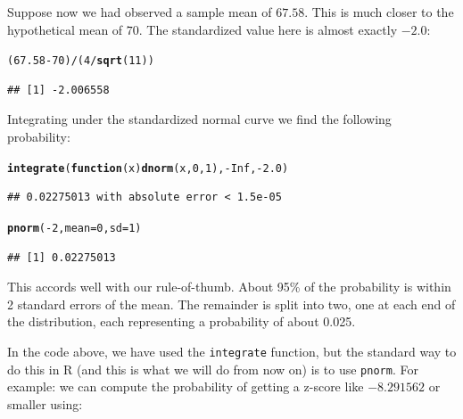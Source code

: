 \documentclass[12pt]{book}\usepackage[]{graphicx}\usepackage[]{color}
\makeatletter
\newcommand{\hlnum}[1]{\textcolor[rgb]{0.686,0.059,0.569}{#1}}%
\newcommand{\hlopt}[1]{\textcolor[rgb]{0,0,0}{#1}}%
\newcommand{\hlstd}[1]{\textcolor[rgb]{0.345,0.345,0.345}{#1}}%
\newcommand{\hlkwa}[1]{\textcolor[rgb]{0.161,0.373,0.58}{\textbf{#1}}}%
\newcommand{\hlkwc}[1]{\textcolor[rgb]{0.333,0.667,0.333}{#1}}%
\newcommand{\hlkwd}[1]{\textcolor[rgb]{0.737,0.353,0.396}{\textbf{#1}}}%
\newenvironment{kframe}{%
 \def\at@end@of@kframe{}%
 \ifinner\ifhmode%
  \def\at@end@of@kframe{\end{minipage}}%
  \begin{minipage}{\columnwidth}%
 \fi\fi%
 \def\FrameCommand##1{\hskip\@totalleftmargin \hskip-\fboxsep
 \colorbox{shadecolor}{##1}\hskip-\fboxsep
     \hskip-\linewidth \hskip-\@totalleftmargin \hskip\columnwidth}%
 \MakeFramed {\advance\hsize-\width
   \@totalleftmargin\z@ \linewidth\hsize
   \@setminipage}}%
 {\par\unskip\endMakeFramed%
 \at@end@of@kframe}
\newenvironment{knitrout}{}{} %
\makeatother
\begin{document}
Suppose now we had observed a sample mean of $67.58$. This is much closer to the hypothetical mean of $70$. The standardized value here is almost exactly $-2.0$:

\begin{knitrout}
\color{fgcolor}\begin{kframe}
\begin{alltt}
\hlstd{(}\hlnum{67.58}\hlopt{-}\hlnum{70}\hlstd{)}\hlopt{/}\hlstd{(}\hlnum{4}\hlopt{/}\hlkwd{sqrt}\hlstd{(}\hlnum{11}\hlstd{))}
\end{alltt}
\begin{verbatim}
## [1] -2.006558
\end{verbatim}
\end{kframe}
\end{knitrout}

Integrating under the standardized normal curve we find the following probability:

\begin{knitrout}
\color{fgcolor}\begin{kframe}
\begin{alltt}
\hlkwd{integrate}\hlstd{(}\hlkwa{function}\hlstd{(}\hlkwc{x}\hlstd{)} \hlkwd{dnorm}\hlstd{(x,} \hlnum{0}\hlstd{,} \hlnum{1}\hlstd{),} \hlopt{-}\hlnum{Inf}\hlstd{,} \hlopt{-}\hlnum{2.0}\hlstd{)}
\end{alltt}
\begin{verbatim}
## 0.02275013 with absolute error < 1.5e-05
\end{verbatim}
\begin{alltt}
\hlkwd{pnorm}\hlstd{(}\hlopt{-}\hlnum{2}\hlstd{,}\hlkwc{mean}\hlstd{=}\hlnum{0}\hlstd{,}\hlkwc{sd}\hlstd{=}\hlnum{1}\hlstd{)}
\end{alltt}
\begin{verbatim}
## [1] 0.02275013
\end{verbatim}
\end{kframe}
\end{knitrout}

This accords well with our rule-of-thumb. About 95\% of the probability is within 2 standard errors of the mean. The remainder is split into two, one at each end of the distribution, each representing a probability of about 0.025.

In the code above, we have used the \texttt{integrate} function, but the standard way to do this in R (and this is what we will do from now on) is to use \texttt{pnorm}.
For example: we can compute the probability of getting a z-score like $-8.291562$ or smaller using:
\end{document}
